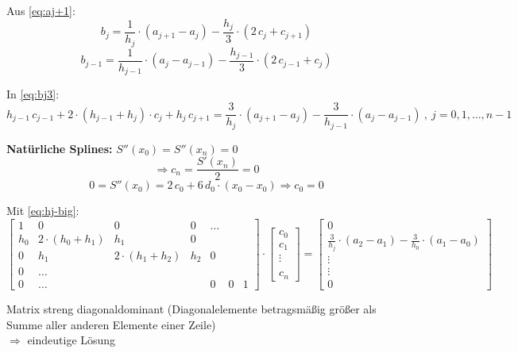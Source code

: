 Aus \autoref{eq:aj+1}:
\begin{equation}
	b_j = \frac{1}{h_j} \cdot (a_{j+1} - a_j) - \frac{h_j}{3} \cdot (2\, c_j + c_{j+1})
	\label{eq:bj3}
\end{equation}
\begin{equation}
	b_{j-1} = \frac{1}{h_{j-1}} \cdot (a_j - a_{j-1}) - \frac{h_{j-1}}{3} \cdot (2\, c_{j-1} + c_j)
\end{equation}

In \autoref{eq:bj3}:
\begin{equation}
	h_{j-1}\, c_{j-1} +2 \cdot (h_{j-1} + h_j) \cdot c_j + h_j\, c_{j+1} = \frac{3}{h_j} \cdot (a_{j+1} - a_j) - \frac{3}{h_{j-1}} \cdot (a_j - a_{j-1})\ , \ j=0,1,\ldots,n-1
	\label{eq:hj-big}
\end{equation}

\textbf{Natürliche Splines: } $S''(x_0) = S''(x_n) = 0$
\begin{equation}
	\Rightarrow c_n = \frac{S'(x_n)}{2} = 0
\end{equation}
\begin{equation}
	0 = S''(x_0) = 2\, c_0 + 6\, d_0 \cdot (x_0 - x_0) \Rightarrow c_0 = 0
\end{equation}

Mit \autoref{eq:hj-big}:
\begin{equation}
	\begin{bmatrix}
		1 & 0 & 0 & 0 & \ldots & & \\
		h_0 & 2\cdot(h_0 + h_1) & h_1 & 0 & & &\\
		0 & h_1 & 2\cdot(h_1 + h_2) & h_2 & 0 & &\\
		0 & \ldots & & & & &\\
		0 & \ldots & & & 0 & 0 & 1
	\end{bmatrix} \cdot 
	\begin{bmatrix}
		c_0 \\ 
		c_1 \\ 
		\vdots \\  
		\\ 
		c_n
	\end{bmatrix} = 
	\begin{bmatrix}
	0 \\ \frac{3}{h_j} \cdot (a_2 - a_1) - \frac{3}{h_0} \cdot (a_1 - a_0) \\ \vdots \\ \vdots \\ 0
	\end{bmatrix}
\end{equation}

Matrix streng diagonaldominant (Diagonalelemente betragsmäßig größer als Summe aller anderen Elemente einer Zeile)\\
$\Rightarrow$ eindeutige Lösung